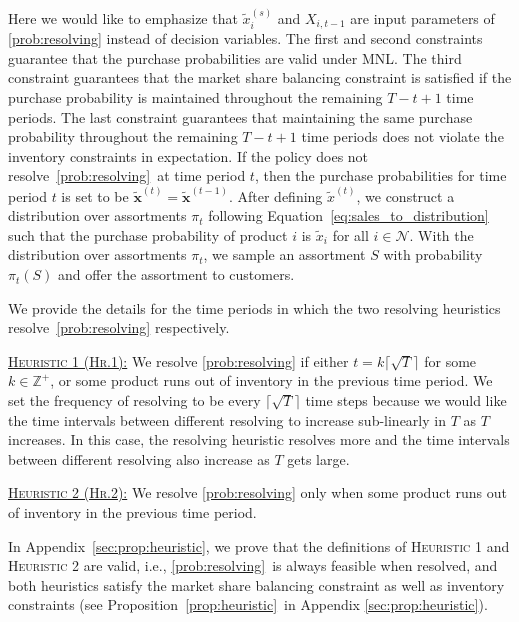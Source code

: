 \documentclass[mnsc,non-blindrev]{informs3}
\theoremstyle{definition}
\begin{document}
\begin{appendices}{\Large{}}
{Here we would like to emphasize that $\tilde{x}_i^{(s)}$ and $X_{i,t-1}$ are input parameters of \ref{prob:resolving} instead of decision variables. The first and second constraints guarantee that the purchase probabilities are valid under MNL. The third constraint guarantees that the market share balancing constraint is satisfied if the purchase probability is maintained throughout the remaining $T-t+1$ time periods. The last constraint guarantees that maintaining the same purchase probability throughout the remaining $T-t+1$ time periods does not violate the inventory constraints in expectation. If the policy does not resolve~\ref{prob:resolving}~at time period $t$, then the purchase probabilities for time period $t$ is set to be $\tilde{\bm{x}}^{(t)}=\tilde{\bm{x}}^{(t-1)}$. After defining $\tilde{x}^{(t)}$, we construct a distribution over assortments $\pi_t$ following Equation~\eqref{eq:sales_to_distribution} such that the purchase probability of product $i$ is $\tilde{x}_i$ for all $i\in\mathcal{N}$. With the distribution over assortments $\pi_t$, we sample an assortment $S$ with probability $\pi_t(S)$ and offer the assortment to customers.

We provide the details for the time periods in which the two resolving heuristics resolve~\ref{prob:resolving} respectively.

\noindent\underline{\textsc{Heuristic 1 (Hr.1):}} We resolve \ref{prob:resolving} if either $t=k\Big\lceil\sqrt{T}\Big\rceil$ for some $k\in\mathbb{Z}^+$, or some product runs out of inventory in the previous time period. We set the frequency of resolving to be every $\lceil\sqrt{T}\rceil$ time steps because we would like the time intervals between different resolving to increase sub-linearly in $T$ as $T$ increases. In this case, the resolving heuristic resolves more and the time intervals between different resolving also increase as $T$ gets large.

\noindent\underline{\textsc{Heuristic 2 (Hr.2):}} We resolve \ref{prob:resolving} only when some product runs out of inventory in the previous time period.

In Appendix~\ref{sec:prop:heuristic}, we prove that the definitions of \textsc{Heuristic 1} and \textsc{Heuristic 2} are valid, i.e., \ref{prob:resolving}~is always feasible when resolved, and both heuristics satisfy the market share balancing constraint as well as inventory constraints (see Proposition~\ref{prop:heuristic}~in Appendix \ref{sec:prop:heuristic}).

}
\end{appendices}
\end{document}
